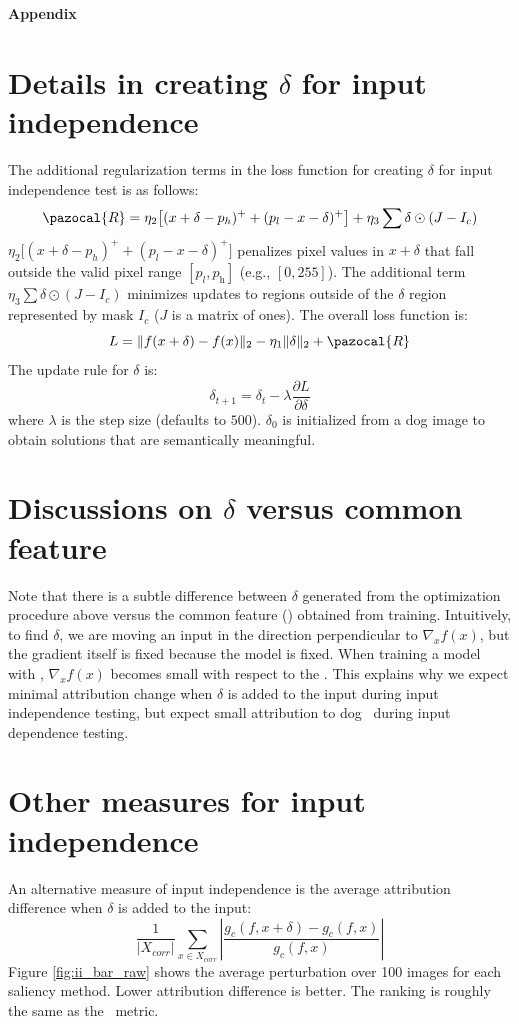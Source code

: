 \begin{appendix}

{\Large \bf Appendix}
\appendix

\section{Details in creating $\delta$ for input independence}
The additional regularization terms in the loss function for creating $\delta$ for input independence test is as follows:
$$ \pazocal{R} = \eta_2\big[(x + \delta - p_{h})^+ + (p_{l} - x - \delta)^+\big] + \eta_3\sum{\delta \odot (J - I_c)}$$
$\eta_2\big[(x + \delta - p_{h})^+ + (p_{l} - x - \delta)^+\big]$ penalizes pixel values in $x+\delta$ that fall outside the valid pixel range $[p_{\textit{l}}, p_{\textit{h}}]$ (e.g., $[0, 255]$). The additional term $\eta_3\sum{\delta \odot (J - I_c)}$ minimizes updates to regions outside of the $\delta$ region represented by mask $I_c$ ($J$ is a matrix of ones). The overall loss function is:
$$L = \|f(x+\delta)-f(x)\|_2 - \eta_1\|\delta\|_2 + \pazocal{R}$$
The update rule for $\delta$ is:
$$\delta_{t+1} = \delta_t - \lambda \frac{\partial L}{\partial \delta}$$
where $\lambda$ is the step size (defaults to $500$). $\delta_0$ is initialized from a dog image to obtain solutions that are semantically meaningful.

\section{Discussions on $\delta$ versus common feature}
Note that there is a subtle difference between $\delta$ generated from the optimization procedure above versus the common feature (\CF) obtained from training. Intuitively, to find $\delta$, we are moving an input in the direction perpendicular to $\nabla_xf(x)$, but the gradient itself is fixed because the model is fixed. When training a model with \CF, $\nabla_xf(x)$ becomes small with respect to the \CF. This explains why we expect minimal attribution change when $\delta$ is added to the input during input independence testing, but expect small attribution to dog \CF~during input dependence testing.

\section{Other measures for input independence}
An alternative measure of input independence is the average attribution difference when $\delta$ is added to the input:
$$\frac{1}{|X_{corr}|}\sum\limits_{x \in X_{corr}}|\frac{g_c(f, x + \delta) - g_c(f, x)}{g_c(f, x)}| $$
Figure \ref{fig:ii_bar_raw} shows the average perturbation over 100 images for each saliency method. Lower attribution difference is better. The ranking is roughly the same as the \IIR~metric.


\end{appendix}
